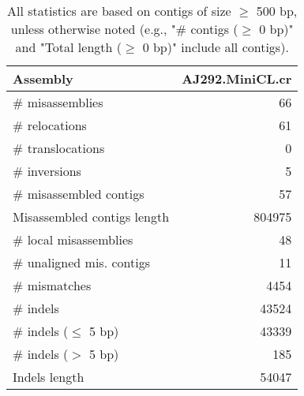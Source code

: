 \documentclass[12pt,a4paper]{article}
\begin{document}
\begin{table}[ht]
\begin{center}
\caption{All statistics are based on contigs of size $\geq$ 500 bp, unless otherwise noted (e.g., "\# contigs ($\geq$ 0 bp)" and "Total length ($\geq$ 0 bp)" include all contigs).}
\begin{tabular}{|l*{1}{|r}|}
\hline
Assembly & AJ292.MiniCL.cr \\ \hline
\# misassemblies & 66 \\ \hline
\hspace{5mm}\# relocations & 61 \\ \hline
\hspace{5mm}\# translocations & 0 \\ \hline
\hspace{5mm}\# inversions & 5 \\ \hline
\# misassembled contigs & 57 \\ \hline
Misassembled contigs length & 804975 \\ \hline
\# local misassemblies & 48 \\ \hline
\# unaligned mis. contigs & 11 \\ \hline
\# mismatches & 4454 \\ \hline
\# indels & 43524 \\ \hline
\hspace{5mm}\# indels ($\leq$ 5 bp) & 43339 \\ \hline
\hspace{5mm}\# indels ($>$ 5 bp) & 185 \\ \hline
Indels length & 54047 \\ \hline
\end{tabular}
\end{center}
\end{table}
\end{document}
